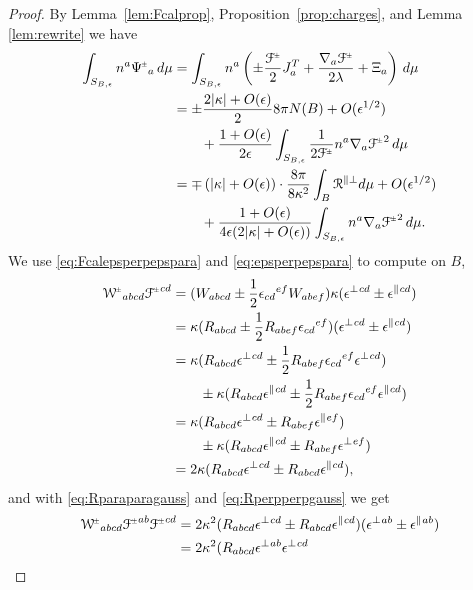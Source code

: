 \documentclass[a4paper,11pt,reqno]{amsart}
\newcommand{\bolt}{B}
\newcommand{\cR}{\mathcal{R}}
\theoremstyle{plain}
\newcommand{\PM}[1]{{{#1}^{\hspace{-.5pt}\scaleto{\pm}{3.5pt}}}}
\def\Wcal{\mathcal{W}}
\def\Fcal{\mathcal{F}}
\numberwithin{equation}{section}
\newcommand{\eps}{\epsilon}
\begin{document}
\begin{proof} 
By Lemma~\ref{lem:Fcalprop}, Proposition~\ref{prop:charges}, and Lemma \ref{lem:rewrite} we have 
%
\begin{align}
\int_{S_{\bolt,\epsilon}} n^a \PM{\Psi}_a \, d\mu
&=
\int_{S_{\bolt,\epsilon}} n^a  
\left(
\pm\frac{\PM{\Fcal}}{2} J^T_a
+ \frac{\nabla_a \PM{\Fcal}}{2\lambda}
 + \Xi_a \right) \, d\mu \\
&=
\pm\frac{2|\kappa| + O(\epsilon)}{2} 8\pi N(\bolt)
+ O(\epsilon^{1/2})
\\
&\qquad
+\frac{1 + O(\epsilon)}{2\epsilon} \int_{S_{\bolt,\epsilon}}
\frac{1}{2\PM{\Fcal}} n^a \nabla_a \PM{\Fcal}^2 \, d\mu
\\
&=
\mp \left( |\kappa| + O(\epsilon) \right)
\cdot \frac{8\pi}{8\kappa^2} \int_\bolt  \cR^{\parallel\perp} d\mu
+ O(\epsilon^{1/2})
\\
&\qquad
+\frac{1 + O(\epsilon)}{4\epsilon (2|\kappa| + O(\epsilon) )} 
\int_{S_{\bolt,\epsilon}} n^a \nabla_a \PM{\Fcal}^2 \, d\mu.
\end{align}
We use \eqref{eq:Fcalepsperpepspara} and \eqref{eq:epsperpepspara} to compute on $\bolt$,
\begin{align}
\PM{\Wcal}_{abcd} \PM{\Fcal}^{cd}
&=
(W_{abcd} \pm \frac{1}{2} \eps_{cd}{}^{ef} W_{abef})
\kappa (\eps^\perp{}^{cd} \pm \eps^\parallel{}^{cd}) \\
&=
\kappa(R_{abcd} \pm \frac{1}{2} R_{abef} \eps_{cd}{}^{ef} )
(\eps^\perp{}^{cd} \pm \eps^\parallel{}^{cd}) \\
&=
\kappa(R_{abcd}\eps^\perp{}^{cd} \pm \frac{1}{2}R_{abef}\eps_{cd}{}^{ef}\eps^\perp{}^{cd}) \\
&\qquad
\pm
\kappa(R_{abcd}\eps^\parallel{}^{cd} \pm \frac{1}{2}R_{abef} \eps_{cd}{}^{ef}\eps^\parallel{}^{cd} ) \\
&=
\kappa(R_{abcd}\eps^\perp{}^{cd} \pm R_{abef}\eps^\parallel{}^{ef}) \\
&\qquad
\pm
\kappa(R_{abcd}\eps^\parallel{}^{cd} \pm R_{abef} \eps^\perp{}^{ef} ) \\
&=
2\kappa 
( R_{abcd}\eps^\perp{}^{cd} \pm R_{abcd}\eps^\parallel{}^{cd} ) ,
\end{align}
and with \eqref{eq:Rparaparagauss} and \eqref{eq:Rperpperpgauss} we get
\begin{align}
\PM{\Wcal}_{abcd} \PM{\Fcal}^{ab} \PM{\Fcal}^{cd}
&=
2\kappa^2 
( R_{abcd}\eps^\perp{}^{cd} \pm R_{abcd}\eps^\parallel{}^{cd} )
(\eps^\perp{}^{ab} \pm \eps^\parallel{}^{ab}) \\
&= 
2\kappa^2 
( R_{abcd}\eps^\perp{}^{ab} \eps^\perp{}^{cd} 

\end{align}
\end{proof}
\end{document}
